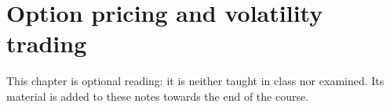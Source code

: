 \chapter{Option pricing and volatility trading}
\label{chap.options}

This chapter is optional reading:
it is neither taught in class nor examined.
Its material is added to these notes towards the end of the course.
